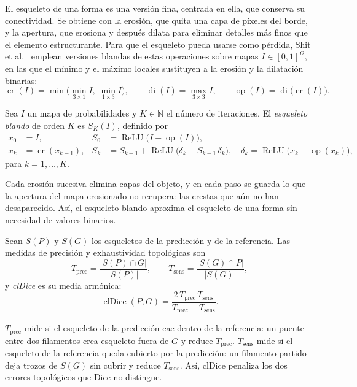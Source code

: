 El esqueleto de una forma es una versión fina, centrada en ella, que
conserva su conectividad. Se obtiene con la erosión, que quita una capa de
píxeles del borde, y la apertura, que erosiona y después dilata para
eliminar detalles más finos que el elemento estructurante. Para que el
esqueleto pueda usarse como pérdida, Shit et al.~\cite{shit2021} emplean
versiones blandas de estas operaciones sobre mapas $I\in[0,1]^{\Omega}$, en
las que el mínimo y el máximo locales sustituyen a la erosión y la dilatación
binarias:
\[
  \operatorname{er}(I)=\min\bigl(\min_{3\times1}I,\;\min_{1\times3}I\bigr),
  \qquad
  \operatorname{di}(I)=\max_{3\times3}I,
  \qquad
  \operatorname{op}(I)=\operatorname{di}\bigl(\operatorname{er}(I)\bigr).
\]

\begin{definicion}
Sea $I$ un mapa de probabilidades y $K\in\mathbb{N}$ el número de
iteraciones. El \emph{esqueleto blando} de orden $K$ es $S_K(I)$, definido por
\begin{align*}
  x_0 &= I, & S_0 &= \operatorname{ReLU}\bigl(I-\operatorname{op}(I)\bigr),\\
  x_k &= \operatorname{er}(x_{k-1}), & S_k &= S_{k-1}+\operatorname{ReLU}\bigl(\delta_k-S_{k-1}\,\delta_k\bigr),
  \quad \delta_k=\operatorname{ReLU}\bigl(x_k-\operatorname{op}(x_k)\bigr),
\end{align*}
para $k=1,\dots,K$.
\end{definicion}

Cada erosión sucesiva elimina capas del objeto, y en cada paso se guarda lo
que la apertura del mapa erosionado no recupera: las crestas que aún no han
desaparecido. Así, el esqueleto blando aproxima el esqueleto de una forma
sin necesidad de valores binarios.

\begin{definicion}
Sean $S(P)$ y $S(G)$ los esqueletos de la predicción y de la referencia. Las
medidas de precisión y exhaustividad topológicas son
\[
  T_{\mathrm{prec}}=\frac{|S(P)\cap G|}{|S(P)|},
  \qquad
  T_{\mathrm{sens}}=\frac{|S(G)\cap P|}{|S(G)|},
\]
y \emph{clDice} es su media armónica:
\[
  \operatorname{clDice}(P,G)=\frac{2\,T_{\mathrm{prec}}\,T_{\mathrm{sens}}}
  {T_{\mathrm{prec}}+T_{\mathrm{sens}}}.
\]
\end{definicion}

$T_{\mathrm{prec}}$ mide si el esqueleto de la predicción cae dentro de la
referencia: un puente entre dos filamentos crea esqueleto fuera de $G$ y
reduce $T_{\mathrm{prec}}$. $T_{\mathrm{sens}}$ mide si el esqueleto de la
referencia queda cubierto por la predicción: un filamento partido deja
trozos de $S(G)$ sin cubrir y reduce $T_{\mathrm{sens}}$. Así, clDice
penaliza los dos errores topológicos que Dice no distingue.

